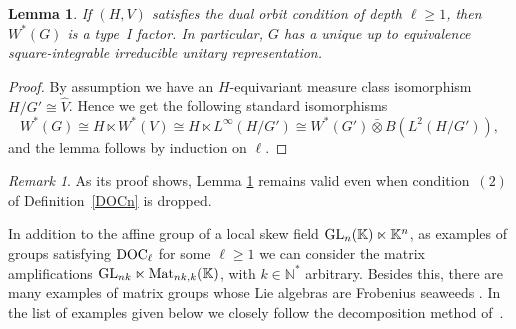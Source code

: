 \documentclass[a4paper,11pt,reqno]{amsart}
\numberwithin{equation}{section}
\newtheorem{lemma}[theorem]{Lemma}
\theoremstyle{remark}
\newtheorem{remark}[theorem]{Remark}
\theoremstyle{definition}
\newcommand{\K}{\mathbb K}
\begin{document}
\begin{lemma}\label{lem:typeI}
If $(H,V)$  satisfies the dual orbit condition of depth $\ell\ge1$, then $W^*(G)$ is a type~I factor. In particular,
$G$ has a unique up to equivalence square-integrable irreducible unitary representation.
\end{lemma}

\begin{proof}
By assumption we have an $H$-equivariant measure class isomorphism $H/G'\cong \hat V$. Hence we get the following standard isomorphisms
$$
W^*(G)\cong H\ltimes W^*(V)\cong H\ltimes L^\infty(H/G')\cong W^*(G')\bar\otimes B(L^2(H/G')),
$$
and the lemma follows by induction on $\ell$.
\end{proof}
\begin{remark}
As its proof shows, Lemma \ref{lem:typeI} remains valid even when condition~$(2)$ of Definition~\ref{DOCn} is dropped.
\end{remark}


In addition to the affine group of a local skew field ${\rm GL}_n(\K)\ltimes \K^n$, as examples of groups satisfying ${\rm DOC}_{\ell}$ for some $\ell\ge1$  we can consider
the matrix amplifications ${\rm GL}_{nk}\ltimes {\rm Mat}_{nk,k}(\K)$, with $k\in\mathbb N^*$ arbitrary.
Besides this, there are many examples of matrix groups whose  Lie algebras are Frobenius seaweeds \cite{DK}. In the list of examples given  below we closely follow the decomposition method of~\cite{Panyushev}.
\end{document}
